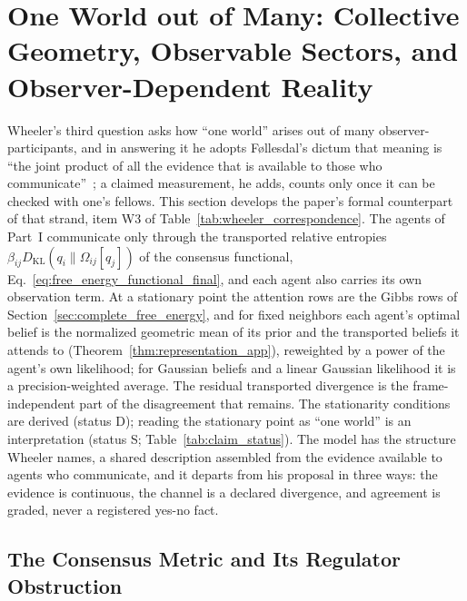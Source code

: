\section{One World out of Many: Collective Geometry, Observable Sectors, and Observer-Dependent Reality}\label{sec:collective_geometry}

Wheeler's third question asks how ``one world'' arises out of many observer-participants, and in answering it he adopts F{\o}llesdal's dictum that meaning is ``the joint product of all the evidence that is available to those who communicate''~\cite{Wheeler1990}; a claimed measurement, he adds, counts only once it can be checked with one's fellows. This section develops the paper's formal counterpart of that strand, item W3 of Table~\ref{tab:wheeler_correspondence}. The agents of Part~I communicate only through the transported relative entropies $\beta_{ij} D_{\mathrm{KL}}(q_i \| \Omega_{ij}[q_j])$ of the consensus functional, Eq.~\eqref{eq:free_energy_functional_final}, and each agent also carries its own observation term. At a stationary point the attention rows are the Gibbs rows of Section~\ref{sec:complete_free_energy}, and for fixed neighbors each agent's optimal belief is the normalized geometric mean of its prior and the transported beliefs it attends to (Theorem~\ref{thm:representation_app}), reweighted by a power of the agent's own likelihood; for Gaussian beliefs and a linear Gaussian likelihood it is a precision-weighted average. The residual transported divergence is the frame-independent part of the disagreement that remains. The stationarity conditions are derived (status D); reading the stationary point as ``one world'' is an interpretation (status S; Table~\ref{tab:claim_status}). The model has the structure Wheeler names, a shared description assembled from the evidence available to agents who communicate, and it departs from his proposal in three ways: the evidence is continuous, the channel is a declared divergence, and agreement is graded, never a registered yes-no fact.

\subsection{The Consensus Metric and Its Regulator Obstruction}
\label{sec:consensus_metric}

